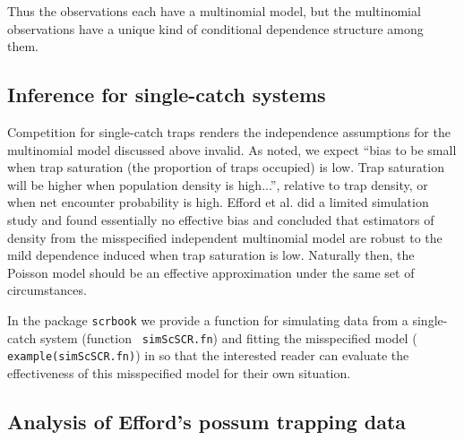 Thus the observations each have a multinomial model, but the
multinomial observations have a unique kind of conditional dependence
structure among them.

\subsection{Inference for single-catch systems}

Competition for single-catch traps renders the independence
assumptions for the multinomial model discussed above invalid.  As
\citet{efford_etal:2009euring} noted, we expect ``bias to be small
when trap saturation (the proportion of traps occupied) is low.  Trap
saturation will be higher when population density is high...'',
relative to trap density, or when net encounter probability is high.
Efford et al. did a limited simulation study and found essentially no
effective bias and concluded that estimators of density from the
misspecified independent multinomial model are robust to the mild
dependence induced when trap saturation is low.  Naturally then, the
Poisson model should be an effective approximation under the same set
of circumstances.

In the \R package \mbox{\tt scrbook} we provide a function for
simulating data from a single-catch system (function \mbox{\tt
  simScSCR.fn}) and fitting the misspecified model (\mbox{\tt
  example(simScSCR.fn)}) in \jags so that the interested reader can
evaluate the effectiveness of this misspecified model for their own
situation.


\subsection{Analysis of Efford's possum trapping data}

